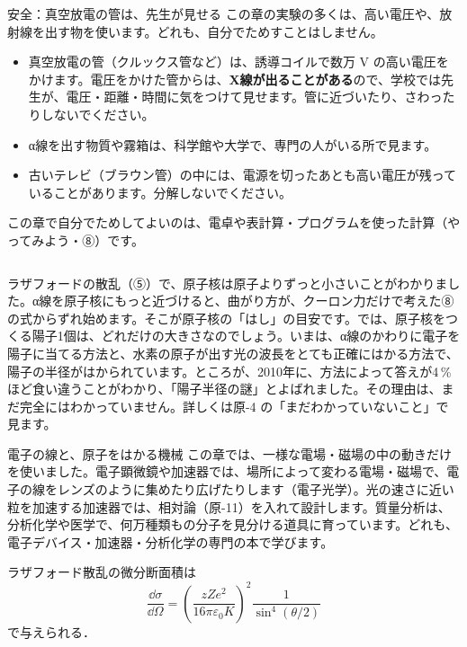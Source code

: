 \label{ph:原-1:sec12}
\begin{column}{安全：真空放電の管は、先生が見せる}
この章の実験の多くは、高い電圧や、放射線を出す物を使います。どれも、自分でためすことはしません。
\begin{itemize}[leftmargin=1.2\zw, itemsep=1pt, topsep=2pt]
\item 真空放電の管（クルックス管など）は、誘導コイルで数万 V の高い電圧をかけます。電圧をかけた管からは、\textbf{X線が出ることがある}ので、学校では先生が、電圧・距離・時間に気をつけて見せます。管に近づいたり、さわったりしないでください。
\item α線を出す物質や霧箱は、科学館や大学で、専門の人がいる所で見ます。
\item 古いテレビ（ブラウン管）の中には、電源を切ったあとも高い電圧が残っていることがあります。分解しないでください。
\end{itemize}
この章で自分でためしてよいのは、電卓や表計算・プログラムを使った計算（やってみよう・⑧）です。
\end{column}

\begin{phmada}[陽子の大きさは？]
ラザフォードの散乱（⑤）で、原子核は原子よりずっと小さいことがわかりました。α線を原子核にもっと近づけると、曲がり方が、クーロン力だけで考えた⑧の式からずれ始めます。そこが原子核の「はし」の目安です。では、原子核をつくる陽子1個は、どれだけの大きさなのでしょう。いまは、α線のかわりに電子を陽子に当てる方法と、水素の原子が出す光の波長をとても正確にはかる方法で、陽子の半径がはかられています。ところが、2010年に、方法によって答えが4\,\% ほど食い違うことがわかり、「陽子半径の謎」とよばれました。その理由は、まだ完全にはわかっていません。詳しくは原-4 の「まだわかっていないこと」で見ます。
\end{phmada}

\begin{phsaki}{電子の線と、原子をはかる機械}
この章では、一様な電場・磁場の中の動きだけを使いました。電子顕微鏡や加速器では、場所によって変わる電場・磁場で、電子の線をレンズのように集めたり広げたりします（電子光学）。光の速さに近い粒を加速する加速器では、相対論（原-11）を入れて設計します。質量分析は、分析化学や医学で、何万種類もの分子を見分ける道具に育っています。どれも、電子デバイス・加速器・分析化学の専門の本で学びます。
\end{phsaki}

\begin{senmonsho}[原子核物理の専門書の書き方]
\begin{bkhonbun}
ラザフォード散乱の微分断面積は
\[ \frac{\dd\sigma}{\dd\Omega}=\left(\frac{zZe^2}{16\pi\varepsilon_0K}\right)^2\frac{1}{\sin^4(\theta/2)} \]
で与えられる．
\end{bkhonbun}
\end{senmonsho}

